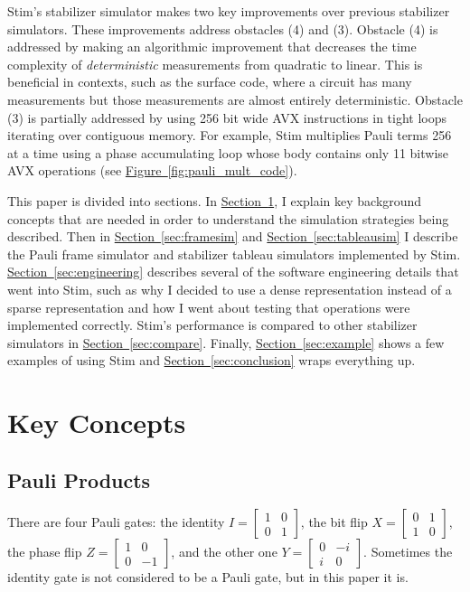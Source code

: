 \documentclass[onecolumn,unpublished]{quantumarticle}
\theoremstyle{definition}
\theoremstyle{definition}
\theoremstyle{definition}
\renewcommand{\sec}[1]{\hyperref[sec:#1]{Section~\ref*{sec:#1}}}
\newcommand{\fig}[1]{\hyperref[fig:#1]{Figure~\ref*{fig:#1}}}
\begin{document}
Stim's stabilizer simulator makes two key improvements over previous stabilizer simulators.
These improvements address obstacles (4) and (3).
Obstacle (4) is addressed by making an algorithmic improvement that decreases the time complexity of {\em deterministic} measurements from quadratic to linear.
This is beneficial in contexts, such as the surface code, where a circuit has many measurements but those measurements are almost entirely deterministic.
Obstacle (3) is partially addressed by using 256 bit wide AVX instructions in tight loops iterating over contiguous memory.
For example, Stim multiplies Pauli terms 256 at a time using a phase accumulating loop whose body contains only 11 bitwise AVX operations (see \fig{pauli_mult_code}).

This paper is divided into sections.
In \sec{concepts}, I explain key background concepts that are needed in order to understand the simulation strategies being described.
Then in \sec{framesim} and \sec{tableausim} I describe the Pauli frame simulator and stabilizer tableau simulators implemented by Stim.
\sec{engineering} describes several of the software engineering details that went into Stim, such as why I decided to use a dense representation instead of a sparse representation and how I went about testing that operations were implemented correctly.
Stim's performance is compared to other stabilizer simulators in \sec{compare}.
Finally, \sec{example} shows a few examples of using Stim and \sec{conclusion} wraps everything up.

\section{Key Concepts}
\label{sec:concepts}

\subsection{Pauli Products}

There are four Pauli gates: the identity $I = \begin{bmatrix} 1&0\\0&1\end{bmatrix}$, the bit flip $X = \begin{bmatrix} 0&1\\1&0\end{bmatrix}$, the phase flip $Z = \begin{bmatrix} 1&0\\0&-1\end{bmatrix}$, and the other one $Y = \begin{bmatrix} 0&-i\\i&0\end{bmatrix}$.
Sometimes the identity gate is not considered to be a Pauli gate, but in this paper it is.
\end{document}
